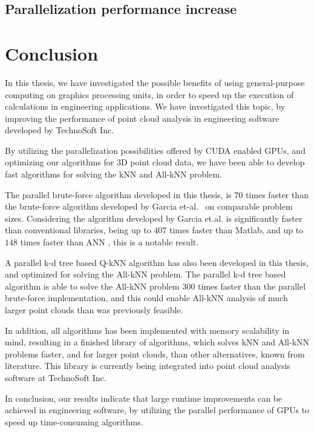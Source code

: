 \subsection{Parallelization performance increase} %
\label{sub:parallelization_performance_increase}
 

\clearpage

\section{Conclusion} %
\label{sec:conclusion}

In this thesis, we have investigated the possible benefits of using general-purpose computing on graphics processing units, in order to speed up the execution of calculations in engineering applications. We have investigated this topic, by improving the performance of point cloud analysis in engineering software developed by TechnoSoft Inc.

By utilizing the parallelization possibilities offered by CUDA enabled GPUs, and optimizing our algorithms for 3D point cloud data, we have been able to develop fast algorithms for solving the kNN and All-kNN problem.

The parallel brute-force algorithm developed in this thesis, is $70$ times faster than the brute-force algorithm developed by Garcia et-al\@.~\cite{Garcia2008} on comparable problem sizes. Considering the algorithm developed by Garcia et.al\@. is significantly faster than conventional libraries, being up to $407$ times faster than Matlab, and up to $148$ times faster than ANN \citep[Table 1]{Garcia2008}, this is a notable result.

A parallel k-d tree based Q-kNN algorithm has also been developed in this thesis, and optimized for solving the All-kNN problem. The parallel k-d tree based algorithm is able to solve the All-kNN problem $300$ times faster than the parallel brute-force implementation, and this could enable All-kNN analysis of much larger point clouds than was previously feasible.

In addition, all algorithms has been implemented with memory scalability in mind, resulting in a finished library of algorithms, which solves kNN and All-kNN problems faster, and for larger point clouds, than other alternatives, known from literature. This library is currently being integrated into point cloud analysis software at TechnoSoft Inc.

In conclusion, our results indicate that large runtime improvements can be achieved in engineering software, by utilizing the parallel performance of GPUs to speed up time-consuming algorithms.
